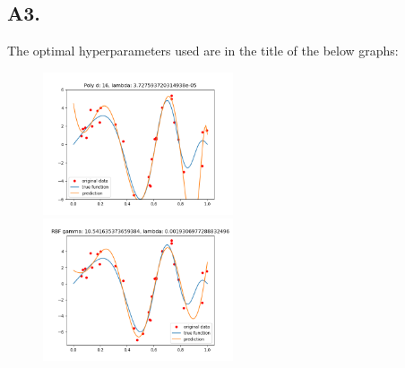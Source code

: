 \documentclass[12pt]{article}
\theoremstyle{definitionstyle}
\begin{document}
    \subsection*{A3.}
    The optimal hyperparameters used are in the title of the below graphs:
    \begin{figure}[H]
        \centering
        \includegraphics[width=0.5\textwidth]{kernels_poly.png}
        \includegraphics[width=0.5\textwidth]{kernels_rbf.png}
    \end{figure}
\end{document}
